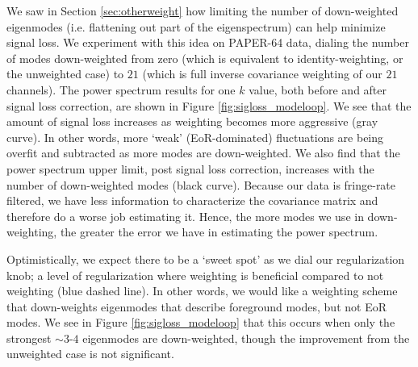 \documentclass[preprint2,numberedappendix,tighten]{aastex6}  %
\begin{document}
We saw in Section \ref{sec:otherweight} how limiting the number of down-weighted eigenmodes (i.e. flattening out part of the 
eigenspectrum) can help minimize signal loss. We experiment with this idea on PAPER-64 data, dialing the number of modes 
down-weighted from zero (which is equivalent to identity-weighting, or the unweighted case) to $21$ (which is full inverse 
covariance weighting of our $21$ channels). The power spectrum results for one $k$ value, both before and after signal loss 
correction, are shown in Figure \ref{fig:sigloss_modeloop}. We see that the amount of signal loss increases as weighting 
becomes more aggressive (gray curve). In other words, more `weak' (EoR-dominated) fluctuations are being overfit and 
subtracted as more modes are down-weighted. We also find that the power spectrum upper limit, post signal loss correction, 
increases with the number of down-weighted modes (black curve). Because our data is fringe-rate filtered, we have less information to characterize the covariance matrix and therefore do a worse job estimating it. Hence, the more modes we use in down-weighting, the greater the error we have in estimating the power spectrum.

Optimistically, we expect there to be a `sweet spot' as we dial our regularization knob; a level of regularization where weighting 
is beneficial compared to not weighting (blue dashed line). In other words, we would like a weighting scheme that down-weights eigenmodes that describe foreground modes, but not EoR modes. We see in Figure \ref{fig:sigloss_modeloop} that this occurs when 
only the strongest $\sim3$-$4$ eigenmodes are down-weighted, though the improvement from the unweighted case is not 
significant. 
\end{document}
